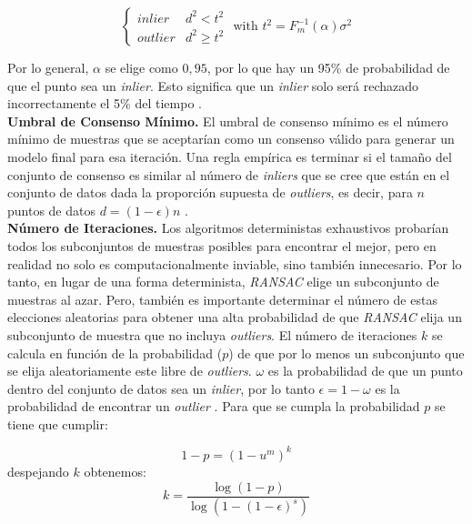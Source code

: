 $$
\left\{
\begin{array}{ll}
	inlier & d^2 < t^2\\
	outlier & d^2 \geq t^2
\end{array}
\right.
\mbox{ with } t^2 = F_{m}^{-1}(\alpha)\sigma^2
$$

Por lo general, $\alpha$ se elige como $0,95$, por lo que hay un 95\% de probabilidad de que el punto sea un \textit{inlier}. Esto significa que un \textit{inlier} solo será rechazado incorrectamente el 5\% del tiempo \cite{RichardAndrew}.\\

\textbf{Umbral de Consenso Mínimo.}
El umbral de consenso mínimo es el número mínimo de muestras que se aceptarían como un consenso válido para generar un modelo final para esa iteración. Una regla empírica es terminar si el tamaño del conjunto de consenso es similar al número de \textit{inliers} que se cree que están en el conjunto de datos dada la proporción supuesta de \textit{outliers}, es decir, para $n$ puntos de datos $d = (1 - \epsilon)n$ \cite{RichardAndrew}.\\

\textbf{Número de Iteraciones.}
Los algoritmos deterministas exhaustivos probarían todos los subconjuntos de muestras posibles para encontrar el mejor, pero en realidad no solo es computacionalmente inviable, sino también innecesario. Por lo tanto, en lugar de una forma determinista, \textit{RANSAC} elige un subconjunto de muestras al azar. Pero, también es importante determinar el número de estas elecciones aleatorias para obtener una alta probabilidad de que \textit{RANSAC} elija un subconjunto de muestra que no incluya \textit{outliers}.
El número de iteraciones $k$ se calcula en función de la probabilidad ($p$) de que por lo menos un subconjunto que se elija aleatoriamente este libre de \textit{outliers}. $\omega$ es la probabilidad de que un punto dentro del conjunto de datos sea un \textit{inlier}, por lo tanto $\epsilon = 1-\omega$ es la probabilidad de encontrar un \textit{outlier} \cite{PabloJuan}. Para que se cumpla la probabilidad $p$ se tiene que cumplir:

$$1 - p = (1 - u^m)^k$$
despejando $k$ obtenemos:
$$k = \frac{\log(1 - p)}{\log(1 - (1 - \epsilon)^s)}$$
